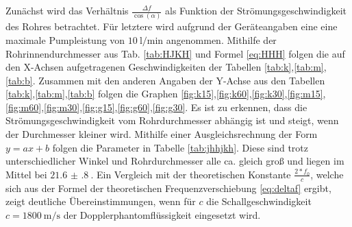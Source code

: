 Zunächst wird das Verhältnis $\frac{\Delta f}{\cos(\alpha)}$ als Funktion der
Strömungsgeschwindigkeit des Rohres betrachtet. Für letztere wird aufgrund der Geräteangaben eine eine maximale
Pumpleistung von $\SI{10}{\litre\per\minute}$ angenommen. Mithilfe der Rohrinnendurchmesser aus Tab. \ref{tab:HJKH} und
Formel \ref{eq:HHH} folgen die auf den X-Achsen aufgetragenen Geschwindigkeiten der Tabellen \ref{tab:k},\ref{tab:m},\ref{tab:b}.
Zusammen mit den anderen Angaben der Y-Achse aus den Tabellen \ref{tab:k},\ref{tab:m},\ref{tab:b} folgen die Graphen
\ref{fig:k15},\ref{fig:k60},\ref{fig:k30},\ref{fig:m15},\ref{fig:m60},\ref{fig:m30},\ref{fig:g15},\ref{fig:g60},\ref{fig:g30}.
Es ist zu erkennen, dass die Strömungsgeschwindigkeit vom Rohrdurchmesser abhängig
ist und steigt, wenn der Durchmesser kleiner wird. Mithilfe einer Ausgleichsrechnung
der Form $y=ax+b$ folgen die Parameter in Tabelle \ref{tab:jhhjkh}. Diese
sind trotz unterschiedlicher Winkel und Rohrdurchmesser alle ca. gleich groß und
liegen im Mittel bei $\SI{21.6(8)}{}$. Ein Vergleich mit der theoretischen
Konstante $\frac{2*f_0}{c}$, welche sich aus der Formel der theoretischen
Frequenzverschiebung \ref{eq:deltaf} ergibt, zeigt deutliche Übereinstimmungen, wenn für $c$
die Schallgeschwindigkeit $c = \SI{1800}{\meter\per\second}$ der Dopplerphantomflüssigkeit
eingesetzt wird.
